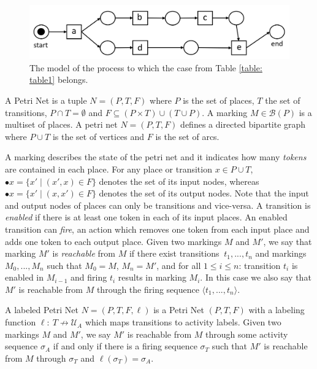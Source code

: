 %
%
%
\begin{figure}[h!]
	\centering
	\includegraphics[width=0.8 \columnwidth]{figures/model1.png}
	\caption{The model of the process to which the case from Table \ref{table: table1} belongs. }
	\label{fig: model1}
\end{figure}
%
%
%
%



\begin{definition}
A Petri Net is a tuple $N=(P,T,F)$ where $P$ is the set of places, $T$ the set of transitions, $P \cap T = \emptyset$ and $F \subseteq (P \times T) \cup (T \cup P)$.
A marking $M \in \mathcal{B}(P)$ is a multiset of places.
A petri net $N=(P,T,F)$ defines a directed bipartite graph where $P \cup T$ is the set of vertices and $F$ is the set of arcs.
\end{definition}

A marking describes the state of the petri net and it indicates how many \textit{tokens} are contained in each place.
For any place or transition $x \in P \cup T$, $\bullet x=\{x' \mid (x',x) \in F\}$ denotes the set of its input nodes, whereas $\bullet x=\{x' \mid (x,x') \in F\}$ denotes the set of its output nodes.
Note that the input and output nodes of places can only be transitions and vice-versa.
A transition is \textit{enabled} if there is at least one token in each of its input places.
An enabled transition can \textit{fire}, an action which removes one token from each input place and adds one token to each output place.
Given two markings $M$ and $M'$, we say that marking $M'$ is \textit{reachable} from $M$ if there exist transitions $\ t_1,...,t_n $ and markings $M_0,...,M_n$ such that $M_0=M$, $M_n=M'$, and for all $1 \leq i \leq n $: transition $t_i$ is enabled in $M_{i-1}$ and firing $t_i$ results in marking $M_i$.
In this case we also say that $M'$ is reachable from $M$ through the firing sequence $\langle t_1,...,t_n \rangle$.

\begin{definition}
A labeled Petri Net $N=(P,T,F,\ell)$ is a Petri Net $(P,T,F)$ with a labeling function $\ell: ~ T \not \to \mathcal{U}_A$ which maps transitions to activity labels.
Given two markings $M$ and $M'$, we say $M'$ is reachable from $M$ through some activity sequence $\sigma_A$ if and only if there is a firing sequence $\sigma_T$ such that $M'$ is reachable from $M$ through $\sigma_T$ and $\ell(\sigma_T)=\sigma_A$.
\end{definition}


